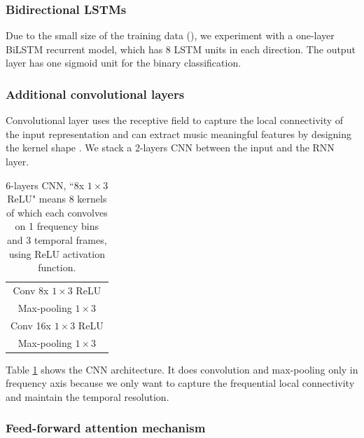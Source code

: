 \subsubsection{Bidirectional LSTMs}\label{sec:ch6:bilstm}

Due to the small size of the training data (), we experiment with a one-layer \gls{BiLSTM} recurrent model, which has 8 \gls{LSTM} units in each direction. The output layer has one sigmoid unit for the binary classification.

\subsubsection{Additional convolutional layers}\label{sec:ch6:cnn}

Convolutional layer uses the receptive field to capture the local connectivity of the input representation and can extract music meaningful features by designing the kernel shape \cite{Pons2017Timbre}. We stack a 2-layers \gls{CNN} between the input and the \gls{RNN} layer.

\begin{table}[ht!]
\centering
\caption{6-layers CNN,  ``8x $1\times3$ ReLU" means 8 kernels of which each convolves on 1 frequency bins and 3 temporal frames, using \gls{ReLU} activation function.}
\label{tab:ch6:cnn_mispronunciation}
\begin{tabular}{c}
\toprule
\gls{Conv} 8x $1{\times}3$ \gls{ReLU}\\
Max-pooling $1{\times}3$ \\
\gls{Conv} 16x $1{\times}3$ \gls{ReLU}\\
Max-pooling $1{\times}3$ \\
\bottomrule
\end{tabular}
\end{table}

Table \ref{tab:ch6:cnn_mispronunciation} shows the \gls{CNN} architecture. It does convolution and max-pooling only in frequency axis because we only want to capture the frequential local connectivity and maintain the temporal resolution. 

\subsubsection{Feed-forward attention mechanism}\label{sec:ch6:feed_forward_att}

